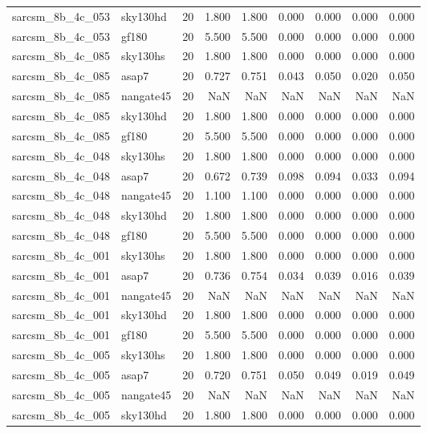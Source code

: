 \begin{tabular}{llrrrrrrr}
sarcsm\_8b\_4c\_053 & sky130hd & 20 & 1.800 & 1.800 & 0.000 & 0.000 & 0.000 & 0.000 \\
sarcsm\_8b\_4c\_053 & gf180 & 20 & 5.500 & 5.500 & 0.000 & 0.000 & 0.000 & 0.000 \\
sarcsm\_8b\_4c\_085 & sky130hs & 20 & 1.800 & 1.800 & 0.000 & 0.000 & 0.000 & 0.000 \\
sarcsm\_8b\_4c\_085 & asap7 & 20 & 0.727 & 0.751 & 0.043 & 0.050 & 0.020 & 0.050 \\
sarcsm\_8b\_4c\_085 & nangate45 & 20 & NaN & NaN & NaN & NaN & NaN & NaN \\
sarcsm\_8b\_4c\_085 & sky130hd & 20 & 1.800 & 1.800 & 0.000 & 0.000 & 0.000 & 0.000 \\
sarcsm\_8b\_4c\_085 & gf180 & 20 & 5.500 & 5.500 & 0.000 & 0.000 & 0.000 & 0.000 \\
sarcsm\_8b\_4c\_048 & sky130hs & 20 & 1.800 & 1.800 & 0.000 & 0.000 & 0.000 & 0.000 \\
sarcsm\_8b\_4c\_048 & asap7 & 20 & 0.672 & 0.739 & 0.098 & 0.094 & 0.033 & 0.094 \\
sarcsm\_8b\_4c\_048 & nangate45 & 20 & 1.100 & 1.100 & 0.000 & 0.000 & 0.000 & 0.000 \\
sarcsm\_8b\_4c\_048 & sky130hd & 20 & 1.800 & 1.800 & 0.000 & 0.000 & 0.000 & 0.000 \\
sarcsm\_8b\_4c\_048 & gf180 & 20 & 5.500 & 5.500 & 0.000 & 0.000 & 0.000 & 0.000 \\
sarcsm\_8b\_4c\_001 & sky130hs & 20 & 1.800 & 1.800 & 0.000 & 0.000 & 0.000 & 0.000 \\
sarcsm\_8b\_4c\_001 & asap7 & 20 & 0.736 & 0.754 & 0.034 & 0.039 & 0.016 & 0.039 \\
sarcsm\_8b\_4c\_001 & nangate45 & 20 & NaN & NaN & NaN & NaN & NaN & NaN \\
sarcsm\_8b\_4c\_001 & sky130hd & 20 & 1.800 & 1.800 & 0.000 & 0.000 & 0.000 & 0.000 \\
sarcsm\_8b\_4c\_001 & gf180 & 20 & 5.500 & 5.500 & 0.000 & 0.000 & 0.000 & 0.000 \\
sarcsm\_8b\_4c\_005 & sky130hs & 20 & 1.800 & 1.800 & 0.000 & 0.000 & 0.000 & 0.000 \\
sarcsm\_8b\_4c\_005 & asap7 & 20 & 0.720 & 0.751 & 0.050 & 0.049 & 0.019 & 0.049 \\
sarcsm\_8b\_4c\_005 & nangate45 & 20 & NaN & NaN & NaN & NaN & NaN & NaN \\
sarcsm\_8b\_4c\_005 & sky130hd & 20 & 1.800 & 1.800 & 0.000 & 0.000 & 0.000 & 0.000 \\

\end{tabular}

